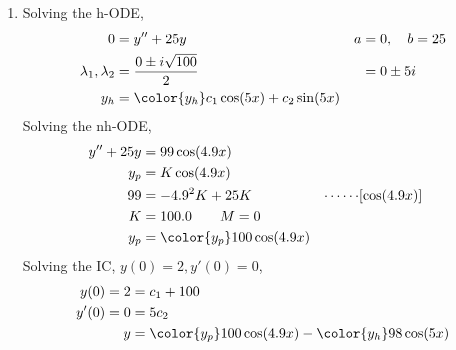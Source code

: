 \begin{enumerate}
    \item Solving the h-ODE,
          \begin{align}
              0                        & = y'' + 25y                                 &
              a                        & = 0, \quad b = 25                             \\
              \lambda_{1}, \lambda_{2} & = \frac{0 \pm i\sqrt{100}}{2}               &
                                       & = 0 \pm 5i                                    \\
              y_{h}                    & = \color{y_h} c_{1}\cos(5x) + c_{2}\sin(5x)
          \end{align}
          Solving the nh-ODE,
          \begin{align}
              y'' + 25y & = 99\cos(4.9 x)                                             \\
              y_{p}     & = K\cos(4.9 x)                                              \\
              99        & = -4.9^{2}K + 25K            & \cdots\cdots & [\cos(4.9 x)] \\
              K         & = 100.0 \qquad M = 0                                        \\
              y_{p}     & = \color{y_p} 100\cos(4.9 x)
          \end{align}
          Solving the IC, $ y(0) = 2, y'(0) = 0 $,
          \begin{align}
              y(0) = 2  & = c_{1} + 100                  \\
              y'(0) = 0 & = 5c_{2}                       \\
              y         & = {\color{y_p} 100\cos(4.9x) }
              - {\color{y_h} 98\cos(5x)}
          \end{align}

          \begin{figure}[H]
              \centering
          \end{figure}


\end{enumerate}
